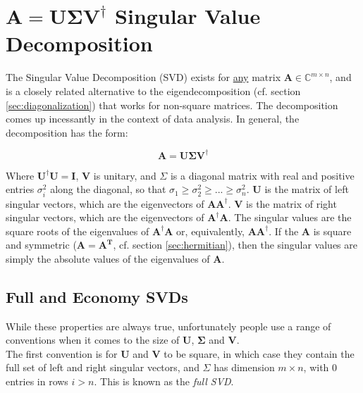 \section{$\mathbf{A} = \mathbf{U\Sigma V}^{\dagger}$ Singular Value Decomposition}
\label{sec:svd}

The Singular Value Decomposition (SVD) exists for \underline{any} matrix $\mathbf{A}\in\mathbb{C}^{m\times n}$, and is a closely related alternative to the eigendecomposition (cf. section \ref{sec:diagonalization}) that works for non-square matrices. The decomposition comes up incessantly in the context of data analysis. In general, the decomposition has the form:

\begin{equation}
\mathbf{A} = \mathbf{U\Sigma V^{\dagger}}
\end{equation}

Where $\mathbf{U^{\dagger}}\mathbf{U} = \mathbf{I}$, $\mathbf{V}$ is unitary, and $\Sigma$ is a diagonal matrix with real and positive entries $\sigma_i^2$ along the diagonal, so that $\sigma_1 \geq \sigma^2_2 \geq ...\geq \sigma^2_n$. $\mathbf{U}$ is the matrix of left singular vectors, which are the eigenvectors of $\mathbf{A A^{\dagger}}$. $\mathbf{V}$ is the matrix of right singular vectors, which are the eigenvectors of $\mathbf{A^{\dagger} A}$. The singular values are the square roots of the eigenvalues of $\mathbf{A^{\dagger}A}$ or, equivalently, $\mathbf{AA^{\dagger}}$. If the $\mathbf{A}$ is square and symmetric ($\mathbf{A}=\mathbf{A^T}$, cf. section \ref{sec:hermitian}), then the singular values are simply the absolute values of the eigenvalues of $\mathbf{A}$. 
\\


\subsection{Full and Economy SVDs}
While these properties are always true, unfortunately people use a range of conventions when it comes to the size of $\mathbf{U}$, $\mathbf{\Sigma}$ and $\mathbf{V}$. \\

The first convention is for $\mathbf{U}$ and $\mathbf{V}$ to be square, in which case they contain the full set of left and right singular vectors, and $\Sigma$ has dimension $m\times n$, with $0$ entries in rows $i>n$. This is known as the \textit{full SVD}.\\

